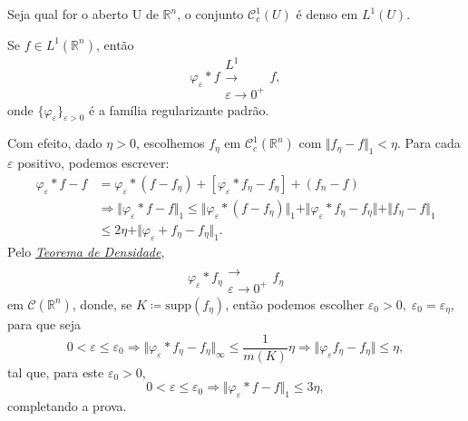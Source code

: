 \documentclass[../distribution_theory_notes.tex]{subfiles}
\begin{document}
         \begin{lemma*}
           Seja qual for o aberto U de \(\mathbb{R}^{n}\), o conjunto \(\mathcal{C}_{c}^{1}(U)\) é denso em \(L^{1}(U)\).
         \end{lemma*}
        \begin{lemma*}
          Se \(f\in L^{1}(\mathbb{R}^{n})\), então 
            \[
            \varphi_\varepsilon *f\substack{L^{1} \\ \longrightarrow \\ \varepsilon \to 0^{+}}f,
            \]
            onde \(\{\varphi_\varepsilon \}_{\varepsilon >0}\) é a família regularizante padrão.
        \end{lemma*}
       \begin{proof*}
         Com efeito, dado \(\eta >0\), escolhemos \(f_\eta \) em \(\mathcal{C}_{c}^{1}(\mathbb{R}^{n})\) com \(\Vert f_{\eta }-f \Vert_1<\eta \). Para cada \(\varepsilon \) positivo, podemos escrever: 
        \begin{align*}
          \varphi_\varepsilon *f - f &= \varphi_{\varepsilon }*(f-f_{\eta })+[\varphi_{\varepsilon }*f_{\eta }-f_{\eta }]+(f_{n}-f)\\ 
                                     &\Rightarrow \Vert \varphi_{\varepsilon }*f-f \Vert_1 \leq \Vert \varphi_{\varepsilon }*(f-f_{\eta }) \Vert_1 + \Vert \varphi_{\varepsilon }*f_{\eta }-f_{\eta } \Vert+\Vert f_{\eta }-f \Vert_1\\ 
                                     &\leq 2\eta + \Vert \varphi_{\varepsilon }+f_{\eta }-f_{\eta } \Vert_{1}.
        \end{align*}
        Pelo \hyperlink{density_theorem}{\textit{Teorema de Densidade}}, 
          \[
            \varphi_{\varepsilon }*f_{\eta }\substack{ \\ \longrightarrow \\ \varepsilon\to 0^{+}}f_{\eta }
          \]
          em \(\mathcal{C}(\mathbb{R}^{n})\), donde, se \(K\coloneqq \mathrm{supp}(f_{\eta })\), então podemos escolher \(\varepsilon_{0}>0,\; \varepsilon_{0}=\varepsilon_{\eta }\), para que seja 
            \[
              0<\varepsilon \leq \varepsilon_{0} \Rightarrow \Vert \varphi_{\varepsilon }*f_{\eta }-f_{\eta } \Vert_{\infty}\leq \frac{1}{m(K)}\eta \Rightarrow \Vert \varphi_{\varepsilon }f_{\eta }-f_{\eta } \Vert\leq \eta ,
            \]
            tal que, para este \(\varepsilon_{0}>0\), 
              \[
                0<\varepsilon \leq \varepsilon_{0}\Rightarrow \Vert \varphi_{\varepsilon }*f -f \Vert_{1}\leq 3\eta ,
              \]
              completando a prova. \qedsymbol
       \end{proof*}
\end{document}
